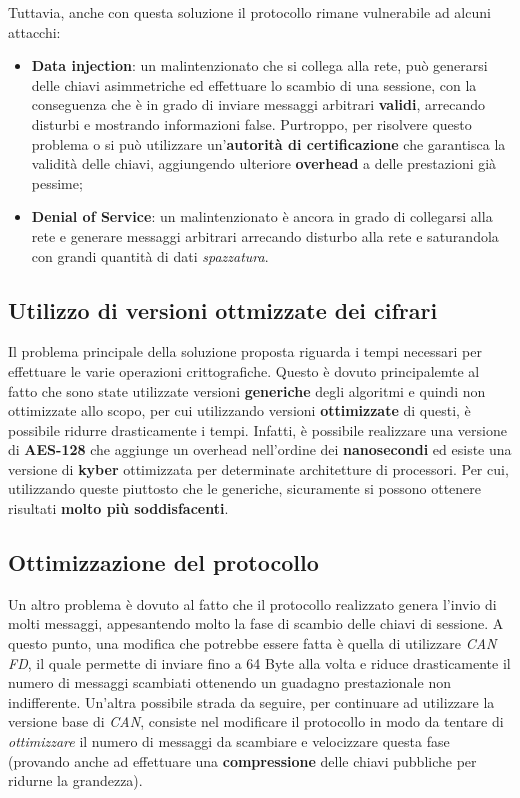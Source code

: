 Tuttavia, anche con questa soluzione il protocollo rimane vulnerabile ad alcuni attacchi:
\begin{itemize}
	\item \textbf{Data injection}: un malintenzionato che si collega alla rete, può generarsi delle chiavi asimmetriche ed effettuare lo scambio di una sessione, con la conseguenza che è in grado di inviare messaggi arbitrari \textbf{validi}, arrecando disturbi e mostrando informazioni false. Purtroppo, per risolvere questo problema o si può utilizzare un'\textbf{autorità di certificazione} che garantisca la validità delle chiavi, aggiungendo ulteriore \textbf{overhead} a delle prestazioni già pessime;
	\item \textbf{Denial of Service}: un malintenzionato è ancora in grado di collegarsi alla rete e generare messaggi arbitrari arrecando disturbo alla rete e saturandola con grandi quantità di dati \emph{spazzatura}.
\end{itemize}

\subsection{Utilizzo di versioni ottmizzate dei cifrari}
Il problema principale della soluzione proposta riguarda i tempi necessari per effettuare le varie operazioni crittografiche. Questo è dovuto principalemte al fatto che sono state utilizzate versioni \textbf{generiche} degli algoritmi e quindi non ottimizzate allo scopo, per cui utilizzando versioni \textbf{ottimizzate} di questi, è possibile ridurre drasticamente i tempi. Infatti, è possibile realizzare una versione di \textbf{AES-128} che aggiunge un overhead nell'ordine dei \textbf{nanosecondi} \cite{bozdal_samie_jennions_2018} ed esiste una versione di \textbf{kyber} ottimizzata per determinate architetture di processori. Per cui, utilizzando queste piuttosto che le generiche, sicuramente si possono ottenere risultati \textbf{molto più soddisfacenti}.

\subsection{Ottimizzazione del protocollo}
Un altro problema è dovuto al fatto che il protocollo realizzato genera l'invio di molti messaggi, appesantendo molto la fase di scambio delle chiavi di sessione. A questo punto, una modifica che potrebbe essere fatta è quella di utilizzare \emph{CAN FD}, il quale permette di inviare fino a 64 Byte alla volta e riduce drasticamente il numero di messaggi scambiati ottenendo un guadagno prestazionale non indifferente. Un'altra possibile strada da seguire, per continuare ad utilizzare la versione base di \emph{CAN}, consiste nel modificare il protocollo in modo da tentare di \emph{ottimizzare} il numero di messaggi da scambiare e velocizzare questa fase (provando anche ad effettuare una \textbf{compressione} delle chiavi pubbliche per ridurne la grandezza).

